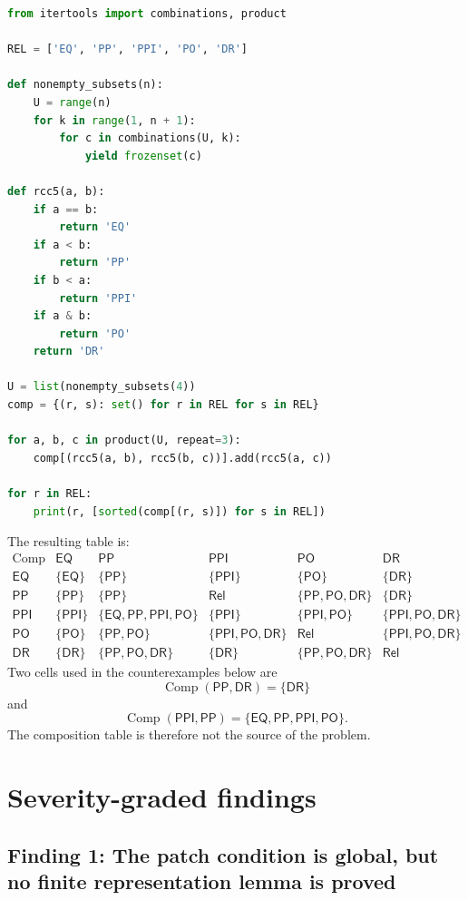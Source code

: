 \documentclass[11pt]{article}
\newcommand{\Rel}{\mathsf{Rel}}
\newcommand{\EQ}{\mathsf{EQ}}
\newcommand{\PP}{\mathsf{PP}}
\newcommand{\PPI}{\mathsf{PPI}}
\newcommand{\PO}{\mathsf{PO}}
\newcommand{\DR}{\mathsf{DR}}
\newcommand{\Comp}{\operatorname{Comp}}
\begin{document}
\begin{lstlisting}[language=Python,caption={Subset-enumeration check of RCC5 composition}]
from itertools import combinations, product

REL = ['EQ', 'PP', 'PPI', 'PO', 'DR']

def nonempty_subsets(n):
    U = range(n)
    for k in range(1, n + 1):
        for c in combinations(U, k):
            yield frozenset(c)

def rcc5(a, b):
    if a == b:
        return 'EQ'
    if a < b:
        return 'PP'
    if b < a:
        return 'PPI'
    if a & b:
        return 'PO'
    return 'DR'

U = list(nonempty_subsets(4))
comp = {(r, s): set() for r in REL for s in REL}

for a, b, c in product(U, repeat=3):
    comp[(rcc5(a, b), rcc5(b, c))].add(rcc5(a, c))

for r in REL:
    print(r, [sorted(comp[(r, s)]) for s in REL])
\end{lstlisting}

The resulting table is:
\[
\begin{array}{c|ccccc}
\Comp & \EQ & \PP & \PPI & \PO & \DR\\
\hline
\EQ  & \{\EQ\} & \{\PP\} & \{\PPI\} & \{\PO\} & \{\DR\}\\
\PP  & \{\PP\} & \{\PP\} & \Rel & \{\PP,\PO,\DR\} & \{\DR\}\\
\PPI & \{\PPI\} & \{\EQ,\PP,\PPI,\PO\} & \{\PPI\} & \{\PPI,\PO\} & \{\PPI,\PO,\DR\}\\
\PO  & \{\PO\} & \{\PP,\PO\} & \{\PPI,\PO,\DR\} & \Rel & \{\PPI,\PO,\DR\}\\
\DR  & \{\DR\} & \{\PP,\PO,\DR\} & \{\DR\} & \{\PP,\PO,\DR\} & \Rel
\end{array}
\]
Two cells used in the counterexamples below are
\[
  \Comp(\PP,\DR)=\{\DR\}
\]
and
\[
  \Comp(\PPI,\PP)=\{\EQ,\PP,\PPI,\PO\}.
\]
The composition table is therefore not the source of the problem.

\section{Severity-graded findings}

\subsection{Finding 1: The patch condition is global, but no finite representation lemma is proved}
\end{document}
